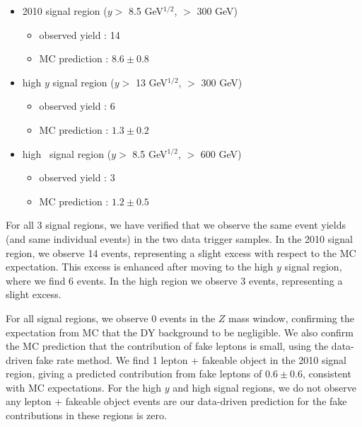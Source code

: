 \begin{itemize}
\item 2010 signal region ($y >$ 8.5 GeV$^{1/2}$, \Ht $>$ 300 GeV)
   \begin{itemize} 
   \item observed yield : 14 
   \item MC prediction  : $8.6 \pm 0.8$
   \end{itemize}  
\item high $y$ signal region ($y >$ 13 GeV$^{1/2}$, \Ht $>$ 300 GeV)
   \begin{itemize} 
   \item observed yield : 6 
   \item MC prediction  : $1.3 \pm 0.2$
   \end{itemize}  
\item high \Ht\ signal region ($y >$ 8.5 GeV$^{1/2}$, \Ht $>$ 600 GeV)
   \begin{itemize} 
   \item observed yield : 3 
   \item MC prediction  : $1.2 \pm 0.5$
   \end{itemize}  
\end{itemize}

For all 3 signal regions, we have verified that we observe the same
event yields (and same individual events) in the two data trigger samples.
In the 2010 signal region, we observe 14 events, representing 
a slight excess with respect to the MC expectation. This excess is enhanced
after moving to the high $y$ signal region, where we find 6 events. 
In the high \Ht region we observe 3 events, representing a slight excess.

For all signal regions, we observe 0 events in the $Z$ mass window,
confirming the expectation from MC that the 
DY background to be negligible. We also confirm the MC prediction that
the contribution of fake leptons is small, using the data-driven fake
rate method. We find 1 lepton + fakeable object in the 2010 signal region,
giving a predicted contribution from fake leptons of $0.6 \pm 0.6$, consistent
with MC expectations. For the high $y$ and high \Ht signal regions, we do
not observe any lepton + fakeable object events are our data-driven prediction
for the fake contributions in these regions is zero.


